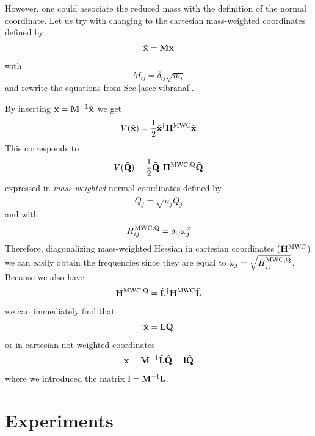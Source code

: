 \documentclass[a4paper,titlepage,twoside,fleqn,12pt]{book}
\begin{document}
\begin{appendices}
However, one could 
associate the reduced mass with the definition of the normal coordinate.
Let us try with changing to the cartesian mass-weighted coordinates defined by
\begin{equation}
\tilde{\bf x} = {\bf M}{\bf x} 
\end{equation}
with
\begin{equation}
M_{ij} = \delta_{ij} \sqrt{m_i}
\end{equation}
and rewrite the equations from Sec.\ref{asec:vibranal}.

By inserting ${\bf x}={\bf M}^{-1}\tilde{\bf x}$ we get
\begin{equation}
V(\tilde{\bf x}) = \frac{1}{2} \tilde{\bf x}^{\dagger} {\bf H}^{\rm MWC}  \tilde{\bf x}
\end{equation}
This corresponds to 
\begin{equation}
V(\tilde{\bf Q}) = \frac{1}{2} \tilde{\bf Q}^{\dagger} {\bf H}^{\rm MWC,Q}  \tilde{\bf Q}
\end{equation}
expressed in \emph{mass-weighted} normal coordinates defined by
\begin{equation}
\tilde{Q}_j = \sqrt{\mu_j} Q_j
\end{equation}
and with 
\begin{equation}
H_{ij}^{\rm MWC,Q} = \delta_{ij} \omega_j^2
\end{equation}
Therefore, diagonalizing mass-weighted Hessian in cartesian coordinates (${\bf H}^{\rm MWC}$)
we can easily obtain the frequencies since they are equal to $\omega_j=\sqrt{H_{jj}^{\rm MWC,Q}}$.
Because we also have
\begin{equation}
{\bf H}^{\rm MWC,Q} = \tilde{\bf L}^{\dagger} {\bf H}^{\rm MWC} \tilde{\bf L}
\end{equation}
we can immediately find that
\begin{equation}
\tilde{\bf x} = \tilde{\bf L} \tilde{\bf Q}
\end{equation}
or in cartesian not-weighted coordinates
\begin{equation}
{\bf x} = {\bf M}^{-1} \tilde{\bf L} \tilde{\bf Q} = {\bf l} \tilde{\bf Q}
\end{equation}
where we introduced the matrix ${\bf l}={\bf M}^{-1} \tilde{\bf L}$.


\chapter{Experiments\label{a:exp-ftir}}


\end{appendices}
\end{document}
